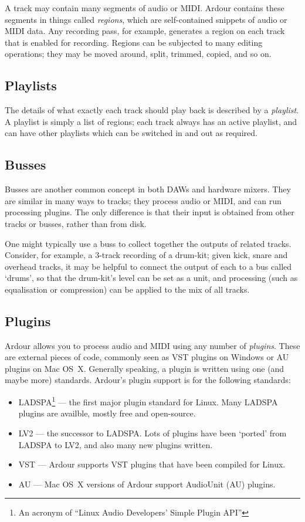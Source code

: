 \documentclass[10pt,a4paper]{book}
\begin{document}
A track may contain many segments of audio or MIDI\@.  Ardour contains
these segments in things called \emph{regions}, which are
self-contained snippets of audio or MIDI data.  Any recording pass,
for example, generates a region on each track that is enabled for
recording.  Regions can be subjected to many editing operations; they
may be moved around, split, trimmed, copied, and so on.


\subsection{Playlists}

The details of what exactly each track should play back is described
by a \emph{playlist}.  A playlist is simply a list of regions; each
track always has an active playlist, and can have other playlists
which can be switched in and out as required.


\subsection{Busses}

Busses are another common concept in both DAWs and hardware mixers.
They are similar in many ways to tracks; they process audio or MIDI,
and can run processing plugins.  The only difference is that their
input is obtained from other tracks or busses, rather than from disk.

One might typically use a buss to collect together the outputs of
related tracks.  Consider, for example, a 3-track recording of a
drum-kit; given kick, snare and overhead tracks, it may be helpful to
connect the output of each to a bus called `drums', so that the
drum-kit's level can be set as a unit, and processing (such as
equalisation or compression) can be applied to the mix of all tracks.


\subsection{Plugins}

Ardour allows you to process audio and MIDI using any number of
\emph{plugins}.  These are external pieces of code, commonly seen as
VST plugins on Windows or AU plugins on Mac OS~X.  Generally speaking,
a plugin is written using one (and maybe more) standards.  Ardour's
plugin support is for the following standards:

\begin{itemize}
\item LADSPA\footnote{An acronym of ``Linux Audio Developers' Simple
  Plugin API''} --- the first major plugin standard for Linux.  Many
  LADSPA plugins are availble, mostly free and open-source.
\item LV2 --- the successor to LADSPA.  Lots of plugins have been
  `ported' from LADSPA to LV2, and also many new plugins written.
\item VST --- Ardour supports VST plugins that have been compiled for Linux.
\item AU --- Mac OS~X versions of Ardour support AudioUnit (AU) plugins.
\end{itemize}
\end{document}
